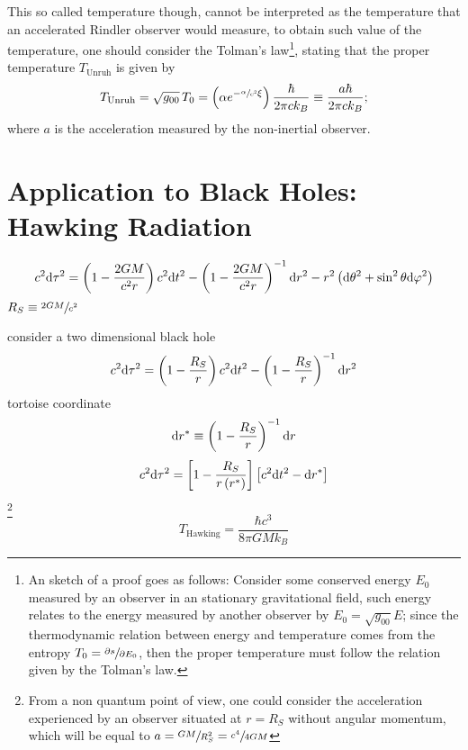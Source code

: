 This so called temperature though, cannot be interpreted as the temperature that an accelerated Rindler observer would measure, to obtain such value of the temperature, one should consider the Tolman's law\footnote{An sketch of a proof goes as follows: Consider some conserved energy $E_0$ measured by an observer in an stationary gravitational field, such energy relates to the energy measured by another observer by $E_0=\sqrt{g_{00}}E$; since the thermodynamic relation between energy and temperature comes from the entropy $T_0=\sfrac{\partial s}{\partial E_0}$, then the proper temperature must follow the relation given by the Tolman's law.}, stating that the proper temperature $T_{\text{Unruh}}$ is given by
\begin{equation}
	T_{\text{Unruh}}=\sqrt{g_{00}}\,T_0=\left(\alpha e^{-\sfrac{\alpha}{c^2}\xi}\right)\frac{\hbar}{2\pi ck_B}\equiv \frac{a\hbar}{2\pi ck_B};
\end{equation}
where $a$ is the acceleration measured by the non-inertial observer.

\section{Application to Black Holes: Hawking Radiation}
\begin{equation}
	c^2\text{d}\tau^2=\left(1-\frac{2GM}{c^2r}\right)c^2\text{d} t^2-\left(1-\frac{2GM}{c^2r}\right)^{-1}\text{d} r^2-r^2\left(\text{d}\theta^2+\sin^2\theta\text{d}\varphi^2\right)
\end{equation}
$R_S\equiv\sfrac{2GM}{c^2}$

consider a two dimensional black hole
\begin{equation}
	c^2\text{d}\tau^2=\left(1-\frac{R_S}{r}\right)c^2\text{d} t^2-\left(1-\frac{R_S}{r}\right)^{-1}\text{d} r^2
\end{equation}
tortoise coordinate
\begin{equation}
	\text{d} r^*\equiv \left(1-\frac{R_S}{r}\right)^{-1}\text{d} r
\end{equation}
\begin{equation}
	c^2\text{d}\tau^2=\left[1-\frac{R_S}{r\left(r^*\right)}\right]\left[c^2\text{d} t^2-\text{d} r^*\right]
\end{equation}
\footnote{From a non quantum point of view, one could consider the acceleration experienced by an observer situated at $r=R_S$ without angular momentum, which will be equal to $a=\sfrac{GM}{R_S^2}=\sfrac{c^4}{4GM}$}
\begin{equation}
	T_{\text{Hawking}}=\frac{\hbar c^3}{8\pi GMk_B}
\end{equation}

